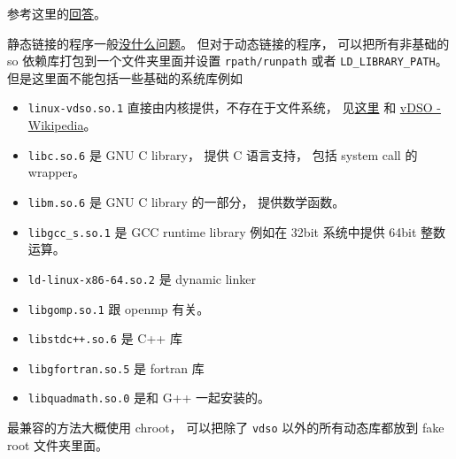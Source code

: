 
\begin{issues}
\issueDraft
\end{issues}


参考这里的\href{https://stackoverflow.com/questions/20183883/determining-binary-compatibility-under-linux}{回答}。

静态链接的程序一般\href{https://stackoverflow.com/questions/31801824/is-static-linking-in-linux-portable}{没什么问题}。 但对于动态链接的程序， 可以把所有非基础的 so 依赖库打包到一个文件夹里面并设置 \verb|rpath/runpath| 或者 \verb|LD_LIBRARY_PATH|。 但是这里面不能包括一些基础的系统库例如
\begin{itemize}
\item \verb`linux-vdso.so.1` 直接由内核提供，不存在于文件系统， 见\href{https://unix.stackexchange.com/questions/476971/ldd-shows-no-location-after-arrow-library-does-not-exist-on-system}{这里} 和 \href{https://en.wikipedia.org/wiki/VDSO}{vDSO - Wikipedia}。
\item \verb`libc.so.6` 是 GNU C library， 提供 C 语言支持， 包括 system call 的 wrapper。
\item \verb`libm.so.6` 是 GNU C library 的一部分， 提供数学函数。
\item \verb`libgcc_s.so.1` 是 GCC runtime library 例如在 32bit 系统中提供 64bit 整数运算。
\item \verb`ld-linux-x86-64.so.2` 是 dynamic linker
\item \verb`libgomp.so.1` 跟 openmp 有关。
\item \verb`libstdc++.so.6` 是 C++ 库
\item \verb`libgfortran.so.5` 是 fortran 库
\item \verb`libquadmath.so.0` 是和 G++ 一起安装的。
\end{itemize}

最兼容的方法大概使用 chroot， 可以把除了 \verb|vdso| 以外的所有动态库都放到 fake root 文件夹里面。
